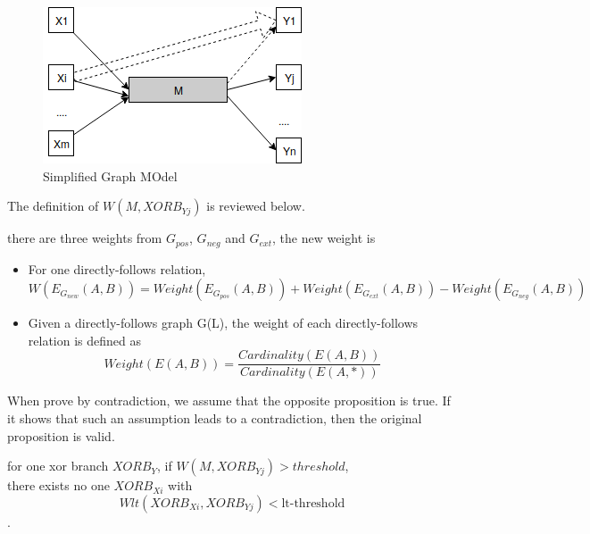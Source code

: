 \begin{figure}[!h]
	\includegraphics[width=\textwidth]{figures/implementation/RelationOfThreshold-LTThreshold.png}
	\caption{Simplified Graph MOdel}
	\label{fig:simplified-graph-model}
\end{figure}

The definition of $W(M, XORB_{Yj})$ is reviewed below.
\begin{definition}
	there are three weights from $G_{pos}$, $G_{neg}$ and $G_{ext}$, the new weight is 
	\begin{itemize}
		\item For one directly-follows relation, \[ W(E_{G_{new}}(A,B)) = Weight(E_{G_{pos}}(A,B)) + Weight(E_{G_{ext}}(A,B)) - Weight(E_{G_{neg}}(A,B))\]
		\item Given a directly-follows graph G(L), the weight of each directly-follows relation is defined as \[ Weight(E(A,B)) = \frac{Cardinality(E(A,B))}{Cardinality(E(A,*))}  \] 
	\end{itemize}
\end{definition}

When prove by contradiction, we assume that the opposite proposition is true. If it shows that such an assumption leads to a contradiction, then the original proposition is valid. 
\begin{proposition}
	for one xor branch $XORB_Y$, if $W(M, XORB_{Yj}) > threshold$, \\ there exists no one $XORB_{Xi}$ with 
	\[Wlt(XORB_{Xi}, XORB_{Yj})<\text{lt-threshold}\]. 
\end{proposition}

